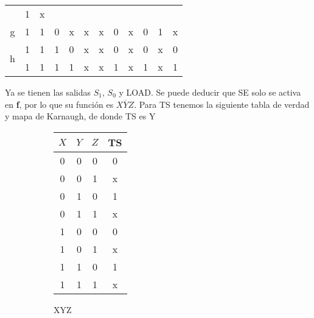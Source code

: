 \begin{table}[H]
\begin{tabular}{c c c c c c c c c c c c}
       & 1 & x %
       \\
    \cmidrule(r){1-6}      \cmidrule(l){7-8} \cmidrule(l){9-10} \cmidrule(l){11-12}
    g  & 1 & 1 & 0 & x & x
       & x & 0 %
       & x & 0 %
       & 1 & x %
       \\
    \cmidrule(r){1-6}      \cmidrule(l){7-8} \cmidrule(l){9-10} \cmidrule(l){11-12}
    \multirow{2}{*}{h}
       & 1 & 1 & 1 & 0 & x
       & x & 0 %
       & x & 0 %
       & x & 0 %
       \\
    \cmidrule(r){2-6}      \cmidrule(l){7-8} \cmidrule(l){9-10} \cmidrule(l){11-12}
       & 1 & 1 & 1 & 1 & x
       & x & 1 %
       & x & 1 %
       & x & 1 %
       \\
    \bottomrule
  \end{tabular}
\end{table}






  Ya se tienen las salidas $S_1$, $S_0$ y LOAD. Se puede deducir que SE solo se activa en \textbf{f}, por lo que su función
  es $X \overline{Y} Z$. Para TS tenemos la siguiente tabla de verdad y mapa de Karnaugh, de donde
  TS es $\text{Y}$
  \begin{figure}[H]
    \begin{subfigure}{0.49\textwidth}
      \centering
      \begin{tabular}{c c c | c}
        \toprule
        $X$ & $Y$ & $Z$ & TS \\ \midrule
        0     & 0     & 0   & 0 \\
        0     & 0     & 1   & x \\
        0     & 1     & 0   & 1 \\
        0     & 1     & 1   & x \\
        1     & 0     & 0   & 0 \\
        1     & 0     & 1   & x \\
        1     & 1     & 0   & 1 \\
        1     & 1     & 1   & x \\
        \bottomrule
      \end{tabular}
    \end{subfigure}
    \begin{subfigure}{0.49\textwidth}
      \centering
      \begin{Karnaughvuit}{X}{Y}{Z}
      \end{Karnaughvuit}
    \end{subfigure}
  \end{figure}
